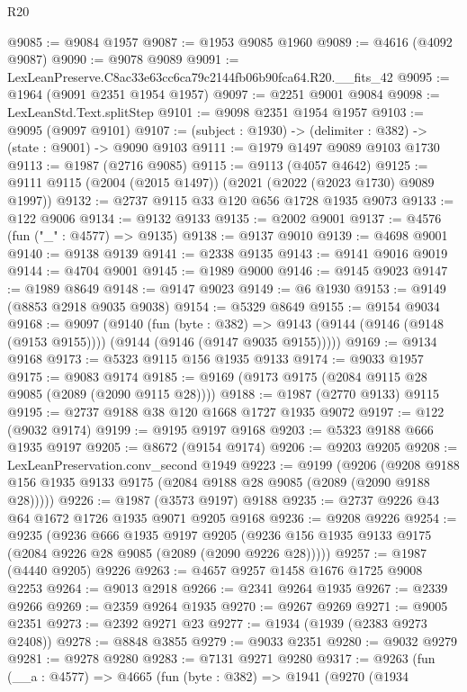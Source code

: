 \begin{lexlean}{R20}
\begin{coremodule}
@9085 := @9084 @1957
@9087 := @1953 @9085 @1960
@9089 := @4616 (@4092 @9087)
@9090 := @9078 @9089
@9091 := LexLeanPreserve.C8ac33e63cc6ca79c2144fb06b90fca64.R20.__fits_42
@9095 := @1964 (@9091 @2351 @1954 @1957)
@9097 := @2251 @9001 @9084
@9098 := LexLeanStd.Text.splitStep
@9101 := @9098 @2351 @1954 @1957
@9103 := @9095 (@9097 @9101)
@9107 := (subject : @1930) -> (delimiter : @382) -> (state : @9001) -> @9090 @9103
@9111 := @1979 @1497 @9089 @9103 @1730
@9113 := @1987 (@2716 @9085)
@9115 := @9113 (@4057 @4642)
@9125 := @9111 @9115 (@2004 (@2015 @1497)) (@2021 (@2022 (@2023 @1730) @9089 @1997))
@9132 := @2737 @9115 @33 @120 @656 @1728 @1935 @9073
@9133 := @122 @9006
@9134 := @9132 @9133
@9135 := @2002 @9001
@9137 := @4576 (fun ("_" : @4577) => @9135)
@9138 := @9137 @9010
@9139 := @4698 @9001
@9140 := @9138 @9139
@9141 := @2338 @9135
@9143 := @9141 @9016 @9019
@9144 := @4704 @9001
@9145 := @1989 @9000
@9146 := @9145 @9023
@9147 := @1989 @8649
@9148 := @9147 @9023
@9149 := @6 @1930
@9153 := @9149 (@8853 @2918 @9035 @9038)
@9154 := @5329 @8649
@9155 := @9154 @9034
@9168 := @9097
    (@9140
      (fun (byte : @382) =>
      @9143 (@9144 (@9146 (@9148 (@9153 @9155)))) (@9144 (@9146 (@9147 @9035 @9155)))))
@9169 := @9134 @9168
@9173 := @5323 @9115 @156 @1935 @9133
@9174 := @9033 @1957
@9175 := @9083 @9174
@9185 := @9169 (@9173 @9175 (@2084 @9115 @28 @9085 (@2089 (@2090 @9115 @28))))
@9188 := @1987 (@2770 @9133) @9115
@9195 := @2737 @9188 @38 @120 @1668 @1727 @1935 @9072
@9197 := @122 (@9032 @9174)
@9199 := @9195 @9197 @9168
@9203 := @5323 @9188 @666 @1935 @9197
@9205 := @8672 (@9154 @9174)
@9206 := @9203 @9205
@9208 := LexLeanPreservation.conv_second @1949
@9223 := @9199
    (@9206 (@9208 @9188 @156 @1935 @9133 @9175 (@2084 @9188 @28 @9085 (@2089 (@2090 @9188 @28)))))
@9226 := @1987 (@3573 @9197) @9188
@9235 := @2737 @9226 @43 @64 @1672 @1726 @1935 @9071 @9205 @9168
@9236 := @9208 @9226
@9254 := @9235
    (@9236
      @666
      @1935
      @9197
      @9205
      (@9236 @156 @1935 @9133 @9175 (@2084 @9226 @28 @9085 (@2089 (@2090 @9226 @28)))))
@9257 := @1987 (@4440 @9205) @9226
@9263 := @4657 @9257 @1458 @1676 @1725 @9008 @2253
@9264 := @9013 @2918
@9266 := @2341 @9264 @1935
@9267 := @2339 @9266
@9269 := @2359 @9264 @1935
@9270 := @9267 @9269
@9271 := @9005 @2351
@9273 := @2392 @9271 @23
@9277 := @1934 (@1939 (@2383 @9273 @2408))
@9278 := @8848 @3855
@9279 := @9033 @2351
@9280 := @9032 @9279
@9281 := @9278 @9280
@9283 := @7131 @9271 @9280
@9317 := @9263
    (fun (__a : @4577) =>
    @4665
      (fun (byte : @382) =>
      @1941
        (@9270
          (@1934

\end{coremodule}
\end{lexlean}
